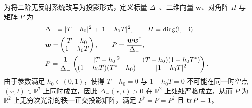 为将二阶无反射系统改写为投影形式，定义标量 $\Delta_-$、二维向量 $\boldsymbol w$、对角阵 $H$ 与矩阵 $P$ 为
\begin{equation}\label{eq:algebraic-P}
\begin{aligned}
&\Delta_-=|T-h_0|^2+|1-h_0T|^2,\qquad
H=\operatorname{diag}(\mathrm{i},-\mathrm{i}),\\
&\boldsymbol w=\begin{pmatrix}T-h_0\\1-h_0T\end{pmatrix},\qquad
P=\dfrac{\boldsymbol w\boldsymbol w^\dagger}{\Delta_-},\\
&P=\dfrac{1}{\Delta_-}\begin{pmatrix}
|T-h_0|^2&(T-h_0)(1-h_0{T}^{*})\\
(1-h_0T)({T}^{*}-h_0)&|1-h_0T|^2
\end{pmatrix}.
\end{aligned}
\end{equation}
由于参数满足 $h_0\in(0,1)$，使得 $T-h_0=0$ 与 $1-h_0T=0$ 不可能在同一时空点 $(x,t)\in\mathbb R^2$ 上同时成立，因此 $\Delta_-(x,t)>0$ 在 $\mathbb R^2$ 上处处严格成立。从而 $P$ 为 $\mathbb R^2$ 上无穷次光滑的秩一正交投影矩阵，满足 $P^\dagger=P=P^2$ 且 $\operatorname{tr} P=1$。

